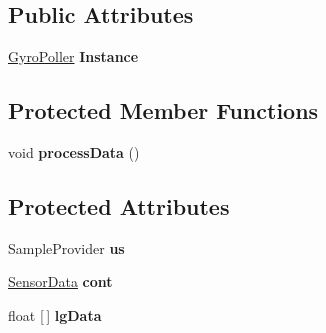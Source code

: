 \subsection*{Public Attributes}
\begin{DoxyCompactItemize}
\item 
\mbox{\label{classca_1_1mcgill_1_1ecse211_1_1sensors_1_1_gyro_poller_a2df6c86572aff4ee54e4b7cfcac1f71b}} 
\hyperlink{classca_1_1mcgill_1_1ecse211_1_1sensors_1_1_gyro_poller}{Gyro\+Poller} {\bfseries Instance}
\end{DoxyCompactItemize}
\subsection*{Protected Member Functions}
\begin{DoxyCompactItemize}
\item 
\mbox{\label{classca_1_1mcgill_1_1ecse211_1_1sensors_1_1_gyro_poller_affd8cf8f49c8619b9617445e54e574f6}} 
void {\bfseries process\+Data} ()
\end{DoxyCompactItemize}
\subsection*{Protected Attributes}
\begin{DoxyCompactItemize}
\item 
\mbox{\label{classca_1_1mcgill_1_1ecse211_1_1sensors_1_1_gyro_poller_a98fc98dff0acec54cec2d14284bd686a}} 
Sample\+Provider {\bfseries us}
\item 
\mbox{\label{classca_1_1mcgill_1_1ecse211_1_1sensors_1_1_gyro_poller_af938c0d98e85a2b52a892b3060a16e55}} 
\hyperlink{classca_1_1mcgill_1_1ecse211_1_1sensors_1_1_sensor_data}{Sensor\+Data} {\bfseries cont}
\item 
\mbox{\label{classca_1_1mcgill_1_1ecse211_1_1sensors_1_1_gyro_poller_a6e6759875b42b8ac6947aac140e74fce}} 
float \mbox{[}$\,$\mbox{]} {\bfseries lg\+Data}
\end{DoxyCompactItemize}


